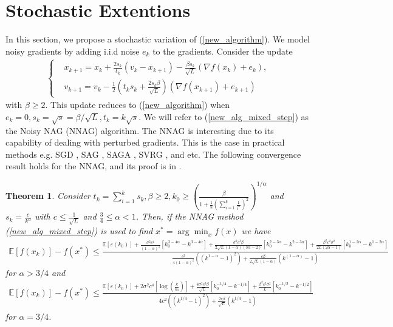 \documentclass{article}
\theoremstyle{plain}
\newtheorem{theorem}{Theorem}[section]
\theoremstyle{definition}
\theoremstyle{remark}
\begin{document}
\section{Stochastic Extentions}\label{section5}
In this section, we propose a stochastic variation of (\ref{new_algorithm}). We model noisy gradients by adding i.i.d noise $e_k$ to the gradients. Consider the update
\begin{align}\label{new_alg_mixed_step}
    \left\{ \begin{array}{ll}
    &x_{k+1}   =    x_{k} + \frac{2s_k}{t_k}(v_k-x_{k+1})-\frac{\beta s_k}{\sqrt{L}}(\nabla f(x_k)+e_k),\\
     &v_{k+1}    = v_k -\tfrac{1}{2}(t_ks_k+\tfrac{2s_k \beta}{\sqrt{L}})(\nabla f(x_{k+1})+e_{k+1})
    \end{array}\right.
\end{align}
with $\beta \geq 2$. This update reduces to (\ref{new_algorithm}) when \(e_k=0, s_k=\sqrt{s}=\beta/\sqrt{L}, t_k=k\sqrt{s}\). We will refer to (\ref{new_alg_mixed_step}) as the Noisy NAG (NNAG) algorithm. The NNAG is interesting due to its capability of dealing with perturbed gradients. This is the case in practical methods e.g. SGD \citep{bottou2010large}, SAG \citep{schmidt2017minimizing}, SAGA \citep{defazio2014saga}, SVRG \citep{johnson2013accelerating}, and etc. The following convergence result holds for the NNAG, and its proof is in .
\begin{theorem}\label{Theorem6}
     Consider $t_k=\sum_{i=1}^k s_k, \beta \geq 2,{k_0\geq (\frac{\beta}{1+\tfrac{1}{8}(\sum_{i=1}^{k}\tfrac{1}{i^{\alpha}})^2})^{1/\alpha}}$ and $s_k=\frac{c}{k^{\alpha}}$ with ${c\leq \frac{1}{\sqrt{L}}}$ and $\frac{3}{4}\leq\alpha<1$. Then, if the NNAG method (\ref{new_alg_mixed_step}) is used to find $x^*=\arg\min_x f(x)$ we have
    \begin{align}
        \mathbb E[f(x_k)]-f(x^*)\leq \tfrac{\mathbb E[\varepsilon(k_0)]+\frac{\sigma^2 c^4}{(1-\alpha)^2} \left[ k_0^{3-4\alpha}-k^{3-4\alpha} \right] + \frac{\sigma^2c^3\beta}{2\sqrt{L}(1-\alpha)(3\alpha -2)}\left[ k_0^{2-3\alpha}-k^{2-3\alpha} \right]+\frac{\beta^2c^2\sigma^2}{2L(2\alpha-1)}\left[ k_0^{1-2\alpha}-k^{1-2\alpha} \right]}{\frac{c^2}{4(1-\alpha)^2}\left((k^{1-\alpha}-1)^2\right)+\frac{c\beta}{2\sqrt{L}(1-\alpha)}\left(k^{(1-\alpha)}-1\right)}\nonumber
    \end{align}
    for $\alpha > 3/4$ and
    \begin{align}\label{Theorem7_rate2}
        \mathbb E[f(x_k)]-f(x^*)\leq \tfrac{\mathbb E[\varepsilon(k_0)]+2\sigma^2 c^4 \left[ \log(\frac{k}{k_0}) \right] + \frac{8\sigma^2c^3\beta}{\sqrt{L}}\left[ k_0^{-1/4}-k^{-1/4} \right]
        +\frac{\beta^2c^2\sigma^2}{L}\left[ k_0^{-1/2}-k^{-1/2} \right]}{4c^2\left((k^{1/4}-1)^2\right)+\frac{2c\beta}{\sqrt{L}}\left(k^{1/4}-1\right)}
    \end{align}
    for $\alpha=3/4$.
\end{theorem}
\end{document}

